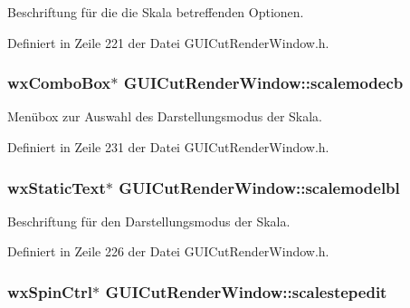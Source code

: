 Beschriftung für die die Skala betreffenden Optionen. 



Definiert in Zeile 221 der Datei G\-U\-I\-Cut\-Render\-Window.\-h.

\hypertarget{classGUICutRenderWindow_af535e1e80e14178ff5c05707261a183d}{
\subsubsection[{scalemodecb}]{\setlength{\rightskip}{0pt plus 5cm}wx\-Combo\-Box$\ast$ G\-U\-I\-Cut\-Render\-Window\-::scalemodecb\hspace{0.3cm}{\ttfamily [private]}}}\label{classGUICutRenderWindow_af535e1e80e14178ff5c05707261a183d}


Menübox zur Auswahl des Darstellungsmodus der Skala. 



Definiert in Zeile 231 der Datei G\-U\-I\-Cut\-Render\-Window.\-h.

\hypertarget{classGUICutRenderWindow_a2a3f0b64122aff2f336f94fb72b3b8ac}{
\subsubsection[{scalemodelbl}]{\setlength{\rightskip}{0pt plus 5cm}wx\-Static\-Text$\ast$ G\-U\-I\-Cut\-Render\-Window\-::scalemodelbl\hspace{0.3cm}{\ttfamily [private]}}}\label{classGUICutRenderWindow_a2a3f0b64122aff2f336f94fb72b3b8ac}


Beschriftung für den Darstellungsmodus der Skala. 



Definiert in Zeile 226 der Datei G\-U\-I\-Cut\-Render\-Window.\-h.

\hypertarget{classGUICutRenderWindow_a4fbe9115e418be48a70eff31e94640ba}{
\subsubsection[{scalestepedit}]{\setlength{\rightskip}{0pt plus 5cm}wx\-Spin\-Ctrl$\ast$ G\-U\-I\-Cut\-Render\-Window\-::scalestepedit\hspace{0.3cm}{\ttfamily [private]}}}\label{classGUICutRenderWindow_a4fbe9115e418be48a70eff31e94640ba}


